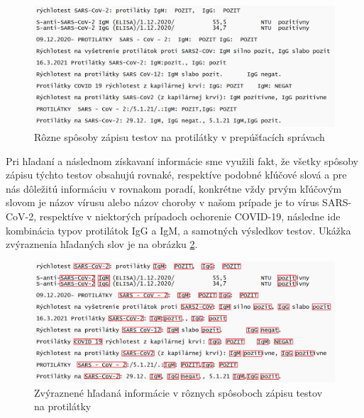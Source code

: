\begin{figure}
	\centerline{\includegraphics[width=1\textwidth]{images/protilatky}}
	\caption[Protilátky]{Rôzne spôsoby zápisu testov na protilátky v prepúšťacích správach}
	\label{obr:proti}
\end{figure}

Pri hľadaní a následnom získavaní informácie sme využili fakt, že všetky spôsoby zápisu týchto testov obsahujú rovnaké, respektíve podobné kľúčové slová a pre nás dôležitú informáciu v rovnakom poradí, konkrétne vždy prvým kľúčovým slovom je názov vírusu alebo názov choroby v našom prípade je to vírus SARS-CoV-2, respektíve v niektorých prípadoch ochorenie COVID-19, následne ide kombinácia typov protilátok IgG a IgM, a samotných výsledkov testov. Ukážka zvýraznenia hľadaných slov je na obrázku \ref{obr:proti_high}.

\begin{figure}
	\centerline{\includegraphics[width=1\textwidth]{images/protilatky_highlight}}
	\caption[Protilátky zvýraznené]{Zvýraznené hľadaná informácie v rôznych spôsoboch zápisu testov na protilátky}
	\label{obr:proti_high}
\end{figure}

